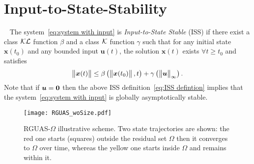 \section{Input-to-State-Stability}\label{ann:ISS}
\begin{definition}
	~\cite{sontag1995scl,sontag2008springer,dashkovskiy2011springer} 
	The system~\eqref{eq:system with input} is \emph{Input-to-State Stable} (ISS) if there exist a class ${\cal KL}$  function $\beta$ and a class ${\cal K}$  function $\gamma$ such that for any initial state $\bm{x}(t_0)$ and any bounded input $\bm{u}(t)$, the solution $\bm{x}(t)$ exists $\forall t\geq t_0$ and satisfies
	\begin{equation}\label{eq:ISS defintion}
		\begin{Vmatrix} \bm{x}(t) \end{Vmatrix}\leq\beta\left(\begin{Vmatrix} \bm{x}(t_0) \end{Vmatrix},t\right)+\gamma\left(\begin{Vmatrix} \bm{u} \end{Vmatrix}_\infty\right).
	\end{equation}
	Note that if $\bm{u}=\mathbf{0}$ then the above ISS definition~\eqref{eq:ISS defintion} implies that the system~\eqref{eq:system with input} is globally asymptotically stable.
\end{definition}
\begin{figure}
	\centering
	\texttt{[image: RGUAS\_woSize.pdf]}
	\caption{RGUAS-$\Omega$ illustrative scheme. Two state trajectories are shown: the red one starts (squares) outside the residual set $\Omega$ then it converges to $\Omega$ over time, whereas the yellow one starts inside $\Omega$ and remains within it.} %
\label{fig:RGUAS}
\end{figure}
